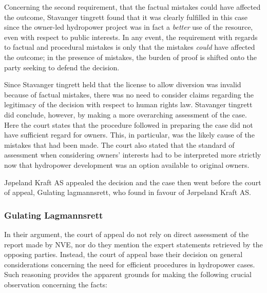 Concerning the second requirement, that the factual mistakes could have affected the outcome, Stavanger tingrett found that it was clearly fulfilled in this case since the owner-led hydropower project was in fact a \emph{better} use of the resource, even with respect to public interests. In any event, the requirement with regards to factual and procedural mistakes is only that the mistakes \emph{could} have affected the outcome; in the presence of mistakes, the burden of proof is shifted onto the party seeking to defend the decision.

Since Stavanger tingrett held that the license to allow diversion was invalid because of factual mistakes, there was no need to consider claims regarding the legitimacy of the decision with respect to human rights law. Stavanger tingrett did conclude, however, by making a more overarching assessment of the case. Here the court states that the procedure followed in preparing the case did not have sufficient regard for owners. This, in particular, was the likely cause of the mistakes that had been made. The court also stated that the standard of assessment when considering owners' interests had to be interpreted more strictly now that hydropower development was an option available to original owners.


Jøpeland Kraft AS appealed the decision and the case then went before the court of appeal, Gulating lagmannsrett, who found in favour of Jørpeland Kraft AS. 

\subsubsection{Gulating Lagmannsrett}

In their argument, the court of appeal do not rely on direct assessment of the report made by NVE, nor do they mention the expert statements retrieved by the opposing parties. Instead, the court of appeal base their decision on general considerations concerning the need for efficient procedures in hydropower cases. Such reasoning provides the apparent grounds for making the following crucial observation concerning the facts:

